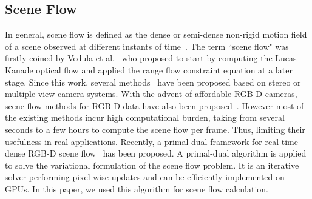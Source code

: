 \documentclass[10pt,twocolumn,letterpaper]{article}
\begin{document}
\subsection{Scene Flow}
In general, scene flow is defined as the dense or semi-dense non-rigid motion
field of a scene observed at different instants of 
time~\cite{vedula2005three,sun2015layered,quiroga2014dense}. The 
term ``scene flow" was firstly coined by Vedula et al.~\cite{vedula2005three} 
who proposed to start by computing the Lucas-Kanade optical flow and applied 
the range flow constraint equation at a later stage. Since this work, several 
methods~\cite{zhang20013d,
wedel2011stereoscopic,vogel2013piecewise} have been proposed based 
on stereo or multiple view camera systems.
With the advent of affordable RGB-D cameras, scene flow methods for
RGB-D data have also been 
proposed~\cite{
vedula2005three,hornacek2014sphereflow,
sun2015layered,quiroga2014dense}. However most of the existing methods 
incur high computational burden, taking from several seconds to a few hours to 
compute the scene flow per frame. Thus, limiting their usefulness in real 
applications. Recently, a primal-dual framework for real-time dense RGB-D 
scene flow~\cite{jaimezprimal} has been proposed. A primal-dual algorithm is 
applied to solve the variational formulation of the scene flow problem. It is 
an iterative solver performing pixel-wise updates and can be efficiently 
implemented on GPUs. In this paper, we used this algorithm for scene flow 
calculation. 
\end{document}
